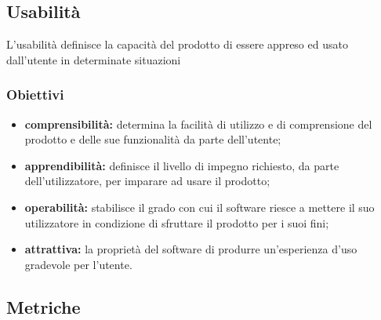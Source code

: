 \subsection{Usabilità}
L'usabilità definisce la capacità del prodotto di essere appreso ed usato dall'utente in determinate situazioni
	\subsubsection{Obiettivi}
		\begin{itemize}
			\item \textbf{comprensibilità:} determina la facilità di utilizzo e di comprensione del prodotto e delle sue funzionalità da parte dell'utente;
			\item \textbf{apprendibilità:} definisce il livello di impegno richiesto, da parte dell'utilizzatore, per imparare ad usare il prodotto;
			\item \textbf{operabilità:} stabilisce il grado con cui il software riesce a mettere il suo utilizzatore in condizione di sfruttare il prodotto per i suoi fini;
			\item \textbf{attrattiva:} la proprietà del software di produrre un'esperienza d'uso gradevole per l'utente.
		\end{itemize}
	\subsection{Metriche}

